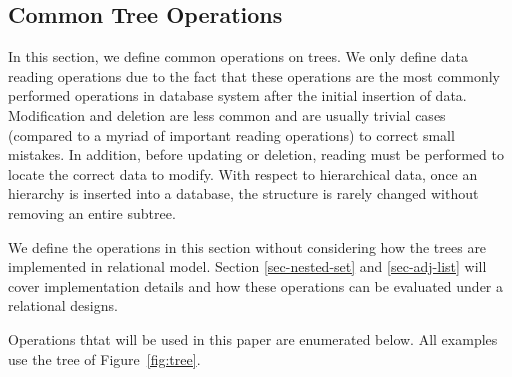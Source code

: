 \subsection{Common Tree Operations}\label{sec_tree_ops}

In this section, we define common operations on trees. We only define data reading operations due to the fact that these operations are the most commonly performed operations in database system after the initial insertion of data. Modification and deletion are less common and are usually trivial cases (compared to a myriad of important reading operations) to correct small mistakes. In addition, before updating or deletion, reading must be performed to locate the correct data to modify. With respect to hierarchical data, once an hierarchy is inserted into a database, the structure is rarely changed without removing an entire subtree.

We define the operations in this section without considering how the trees are implemented in relational model. Section \ref{sec-nested-set} and \ref{sec-adj-list} will cover implementation details and how these operations can be evaluated under a relational designs.


Operations thtat will be used in this paper are enumerated below. All examples use the tree of Figure~\ref{fig:tree}.



